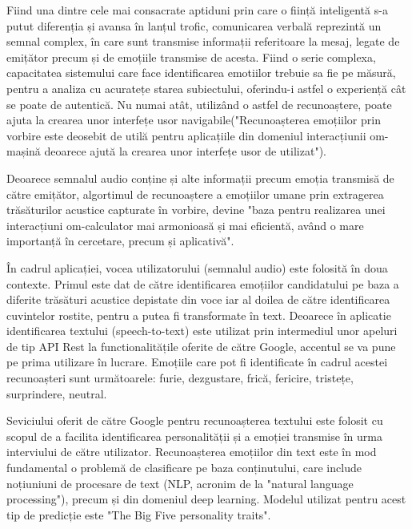 \documentclass[a4paper, 12pt]{report}
\begin{document}
	Fiind una dintre cele mai consacrate aptiduni prin care o ființă inteligentă s-a putut diferenția și avansa în lanțul trofic, comunicarea verbală reprezintă un semnal complex, în care sunt transmise informații referitoare la mesaj, legate de emițător precum și de emoțiile transmise de acesta. Fiind o serie complexa, capacitatea sistemului care face identificarea emotiilor trebuie sa fie pe măsură, pentru a analiza cu acuratețe starea subiectului, oferindu-i astfel o experiență cât se poate de autentică. Nu numai atât, utilizând o astfel de recunoaștere, poate ajuta la crearea unor interfețe usor navigabile("Recunoașterea emoțiilor prin vorbire este deosebit de utilă pentru aplicațiile din domeniul interacțiunii om-mașină deoarece ajută la crearea unor interfețe usor de utilizat"\cite{emotion_recognition_survery}).
	
	Deoarece semnalul audio conține și alte informații precum emoția transmisă de către emițător, algortimul de recunoaștere a emoțiilor umane prin extragerea trăsăturilor acustice capturate în vorbire, devine "baza pentru realizarea unei interacțiuni om-calculator mai armonioasă și mai eficientă, având o mare importanță în cercetare, precum și aplicativă"\cite{audio_emotion_recognition0}.
	
	În cadrul aplicației, vocea utilizatorului (semnalul audio) este folosită în doua contexte. Primul este dat de către identificarea emoțiilor candidatului pe baza a diferite trăsături acustice depistate din voce iar al doilea de către identificarea cuvintelor rostite, pentru a putea fi transformate în text. Deoarece în aplicatie identificarea textului (speech-to-text) este utilizat prin intermediul unor apeluri de tip API Rest la functionalitățile oferite de către Google, accentul se va pune pe prima utilizare în lucrare. Emoțiile care pot fi identificate în cadrul acestei recunoașteri sunt următoarele: furie, dezgustare, frică, fericire, tristețe, surprindere, neutral.
	
	Seviciului oferit de către Google pentru recunoașterea textului \cite{google_speech_to_text} este folosit cu scopul de a facilita identificarea personalității și a emoției transmise în urma interviului de către utilizator. Recunoașterea emoțiilor din text este în mod fundamental o problemă de clasificare pe baza conținutului, care include noțiuniuni de procesare de text (NLP, acronim de la "natural language processing"), precum și din domeniul deep learning. Modelul utilizat pentru acest tip de predicție este "The Big Five personality traits"\cite{big_five_personality_wiki}. 
	
\end{document}
